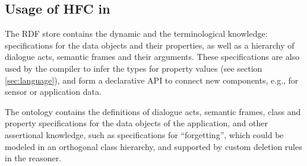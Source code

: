 \subsection{Usage of HFC in \vonda}

The RDF store contains the dynamic and the terminological knowledge:
specifications for the data objects and their properties, as well as a
hierarchy of  dialogue acts,  semantic frames and their arguments. These
specifications are also used by the compiler to infer the types for property
values (see section \ref{sec:language}), and form a declarative API to
connect new components, e.g., for sensor or application data.

The ontology contains the definitions of dialogue acts, semantic frames, class
and property specifications for the data objects of the application, and other
assertional knowledge, such as specifications for ``forgetting'', which could
be modeled in an orthogonal class hierarchy, and supported by custom deletion
rules in the reasoner.
